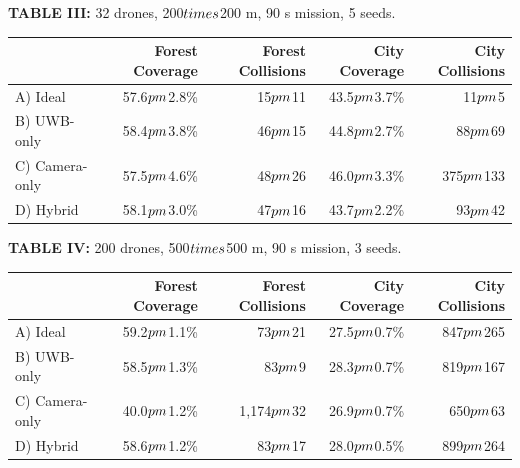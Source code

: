 \documentclass[conference]{IEEEtran}
\begin{document}
\textbf{TABLE III:} 32 drones, 200$\\times$200 m, 90 s mission, 5 seeds.

{\def\LTcaptype{none} %
\begin{longtable}[]{@{}lrrrr@{}}
\toprule\noalign{}
& Forest Coverage & Forest Collisions & City Coverage & City
Collisions \\
\midrule\noalign{}
\endhead
\bottomrule\noalign{}
\endlastfoot
A) Ideal & 57.6$\\pm$2.8\% & 15$\\pm$11 & 43.5$\\pm$3.7\% & 11$\\pm$5 \\
B) UWB-only & 58.4$\\pm$3.8\% & 46$\\pm$15 & 44.8$\\pm$2.7\% & 88$\\pm$69 \\
C) Camera-only & 57.5$\\pm$4.6\% & 48$\\pm$26 & 46.0$\\pm$3.3\% & 375$\\pm$133 \\
D) Hybrid & 58.1$\\pm$3.0\% & 47$\\pm$16 & 43.7$\\pm$2.2\% & 93$\\pm$42 \\
\end{longtable}
}

\textbf{TABLE IV:} 200 drones, 500$\\times$500 m, 90 s mission, 3 seeds.

{\def\LTcaptype{none} %
\begin{longtable}[]{@{}lrrrr@{}}
\toprule\noalign{}
& Forest Coverage & Forest Collisions & City Coverage & City
Collisions \\
\midrule\noalign{}
\endhead
\bottomrule\noalign{}
\endlastfoot
A) Ideal & 59.2$\\pm$1.1\% & 73$\\pm$21 & 27.5$\\pm$0.7\% & 847$\\pm$265 \\
B) UWB-only & 58.5$\\pm$1.3\% & 83$\\pm$9 & 28.3$\\pm$0.7\% & 819$\\pm$167 \\
C) Camera-only & 40.0$\\pm$1.2\% & 1,174$\\pm$32 & 26.9$\\pm$0.7\% & 650$\\pm$63 \\
D) Hybrid & 58.6$\\pm$1.2\% & 83$\\pm$17 & 28.0$\\pm$0.5\% & 899$\\pm$264 \\
\end{longtable}
}
\end{document}
